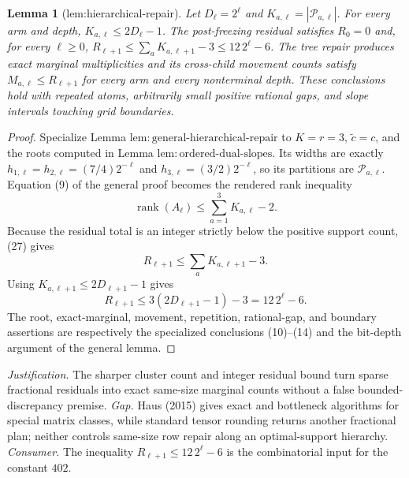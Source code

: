 \documentclass{article}
\newtheorem{lemma}{Lemma}
\begin{document}
\begin{lemma}[lem:hierarchical-repair]\label{lem:hierarchical-repair}
Let \(D_\ell=2^\ell\) and \(K_{a,\ell}=|\mathcal P_{a,\ell}|\).  For every arm and depth, \(K_{a,\ell}\le2D_\ell-1\).  The post-freezing residual satisfies \(R_0=0\) and, for every \(\ell\ge0\), \(R_{\ell+1}\le\sum_aK_{a,\ell+1}-3\le12\,2^\ell-6\).  The tree repair produces exact marginal multiplicities and its cross-child movement counts satisfy \(M_{a,\ell}\le R_{\ell+1}\) for every arm and every nonterminal depth.  These conclusions hold with repeated atoms, arbitrarily small positive rational gaps, and slope intervals touching grid boundaries.
\end{lemma}
\begin{proof}
Specialize Lemma \(\mathrm{lem{:}general\mbox{-}hierarchical\mbox{-}repair}\) to \(K=r=3\), \(\widetilde c=c\), and the roots computed in Lemma \(\mathrm{lem{:}ordered\mbox{-}dual\mbox{-}slopes}\).  Its widths are exactly \(h_{1,\ell}=h_{2,\ell}=(7/4)2^{-\ell}\) and \(h_{3,\ell}=(3/2)2^{-\ell}\), so its partitions are \(\mathcal P_{a,\ell}\).  Equation (9) of the general proof becomes the rendered rank inequality
\[
 \operatorname{rank}(A_\ell)\le\sum_{a=1}^3K_{a,\ell}-2. \tag{27}
\]
Because the residual total is an integer strictly below the positive support count, (27) gives
\[
 R_{\ell+1}\le\sum_aK_{a,\ell+1}-3. \tag{28}
\]
Using \(K_{a,\ell+1}\le2D_{\ell+1}-1\) gives
\[
 R_{\ell+1}\le3(2D_{\ell+1}-1)-3
 =12\,2^\ell-6. \tag{29}
\]
The root, exact-marginal, movement, repetition, rational-gap, and boundary assertions are respectively the specialized conclusions (10)--(14) and the bit-depth argument of the general lemma.
\end{proof}
\par\smallskip\noindent \textit{Justification.} The sharper cluster count and integer residual bound turn sparse fractional residuals into exact same-size marginal counts without a false bounded-discrepancy premise. \textit{Gap.} Haus (2015) gives exact and bottleneck algorithms for special matrix classes, while standard tensor rounding returns another fractional plan; neither controls same-size row repair along an optimal-support hierarchy. \textit{Consumer.} The inequality \(R_{\ell+1}\le12\,2^\ell-6\) is the combinatorial input for the constant \(402\).
\end{document}

